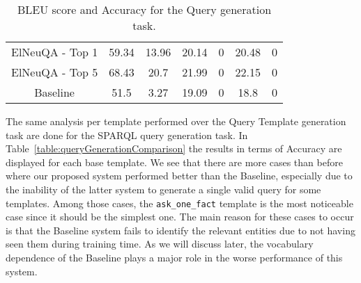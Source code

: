 \begin{table}[h!]
\begin{tabular}{|c|cc|cc|cc|}
    ElNeuQA - Top 1                  & 59.34                                                                               & 13.96                                                             & 20.14                                                                               & 0                                                                 & 20.48                                                                               & 0                                                                 \\
    ElNeuQA - Top 5                  & 68.43                                                                               & 20.7                                                              & 21.99                                                                               & 0                                                                 & 22.15                                                                               & 0                                                                 \\ \hline
    Baseline                         & 51.5                                                                                & 3.27                                                              & 19.09                                                                               & 0                                                                 & 18.8                                                                                & 0                                                                 \\ \hline
    \end{tabular}%
    \caption{BLEU score and Accuracy for the \SPARQL{} Query generation task.}
    \label{table:queryGenerationTestResults}
\end{table}

The same analysis per template performed over the Query Template generation task are done for the 
SPARQL query generation task. In Table~\ref{table:queryGenerationComparison} the results in terms 
of Accuracy are displayed for each \LCQuADtwo{} base template. We see that there are more cases than 
before where our proposed system performed better than the Baseline, especially due to the 
inability of the latter system to generate a single valid query for some templates. Among those 
cases, the \texttt{ask\_one\_fact} template is the most noticeable case since it should be the simplest one. 
The main reason for these cases to occur is that the Baseline system fails to identify the 
relevant entities due to not having seen them during training time. As we will discuss later, the 
vocabulary dependence of the Baseline plays a major role in the worse performance of this system. 

